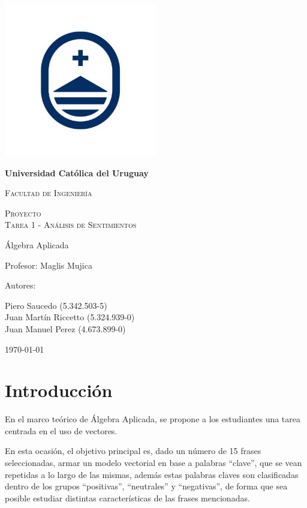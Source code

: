 \documentclass{article}
\begin{document}
    \begin{titlepage}
        \centering
        {\includegraphics[width=0.5\textwidth]{logo2}\par}
        {\bfseries\LARGE Universidad Católica del Uruguay \par}
        \vspace{0.3cm}
        {\scshape\Large Facultad de Ingeniería \par}
        \vspace{0.3cm}
        {\scshape\Huge Proyecto \\Tarea 1 - Análisis de Sentimientos \par}
        \vspace{1cm}
        {\Large Álgebra Aplicada \par}
        {\Large Profesor: Maglis Mujica \par}
        \vfill
        {\Large Autores: \par}
        {\Large Piero Saucedo (5.342.503-5)\\Juan Martín Riccetto (5.324.939-0)\\Juan Manuel Perez (4.673.899-0) \par}
        \vfill
        {\Large \today \par}
    \end{titlepage}

    \section{Introducción}\label{sec:introduccion}
    En el marco teórico de Álgebra Aplicada, se propone a los estudiantes una tarea centrada en el uso de vectores.

    En esta ocasión, el objetivo principal es, dado un número de 15 frases seleccionadas, armar un modelo
    vectorial en base a palabras “clave”, que se vean repetidas a lo largo de las mismas, además estas palabras
    claves son clasificadas dentro de los grupos “positivas”, “neutrales” y “negativas”, de forma que sea posible
    estudiar distintas características de las frases mencionadas.
\end{document}
